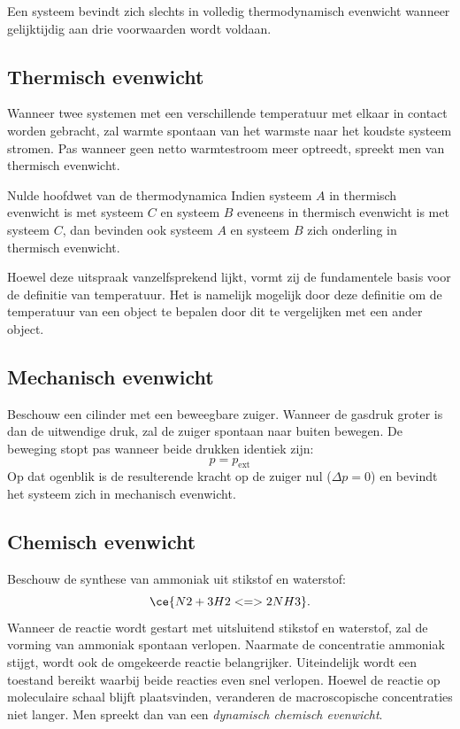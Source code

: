 Een systeem bevindt zich slechts in volledig thermodynamisch evenwicht wanneer gelijktijdig aan drie voorwaarden wordt voldaan.

\subsection{Thermisch evenwicht}

Wanneer twee systemen met een verschillende temperatuur met elkaar in contact worden gebracht, zal warmte spontaan van het warmste naar het koudste systeem stromen. Pas wanneer geen netto warmtestroom meer optreedt, spreekt men van thermisch evenwicht.

\begin{definitie}{Nulde hoofdwet van de thermodynamica}
Indien systeem $A$ in thermisch evenwicht is met systeem $C$ en systeem $B$ eveneens in thermisch evenwicht is met systeem $C$, dan bevinden ook systeem $A$ en systeem $B$ zich onderling in thermisch evenwicht.
\end{definitie}

Hoewel deze uitspraak vanzelfsprekend lijkt, vormt zij de fundamentele basis voor de definitie van temperatuur. Het is namelijk mogelijk door deze definitie om de temperatuur van een object te bepalen door dit te vergelijken met een ander object.

\subsection{Mechanisch evenwicht}

Beschouw een cilinder met een beweegbare zuiger. Wanneer de gasdruk groter is dan de uitwendige druk, zal de zuiger spontaan naar buiten bewegen. De beweging stopt pas wanneer beide drukken identiek zijn:
\begin{equation*}
p = p_{\text{ext}}
\end{equation*}
Op dat ogenblik is de resulterende kracht op de zuiger nul ($\Delta p=0$) en bevindt het systeem zich in mechanisch evenwicht.

\subsection{Chemisch evenwicht}

Beschouw de synthese van ammoniak uit stikstof en waterstof:
\begin{equation*}
\ce{N2 + 3 H2 <=> 2NH3}.
\end{equation*}
Wanneer de reactie wordt gestart met uitsluitend stikstof en waterstof, zal de vorming van ammoniak spontaan verlopen. Naarmate de concentratie ammoniak stijgt, wordt ook de omgekeerde reactie belangrijker. Uiteindelijk wordt een toestand bereikt waarbij beide reacties even snel verlopen. Hoewel de reactie op moleculaire schaal blijft plaatsvinden, veranderen de macroscopische concentraties niet langer. Men spreekt dan van een \emph{dynamisch chemisch evenwicht}.


